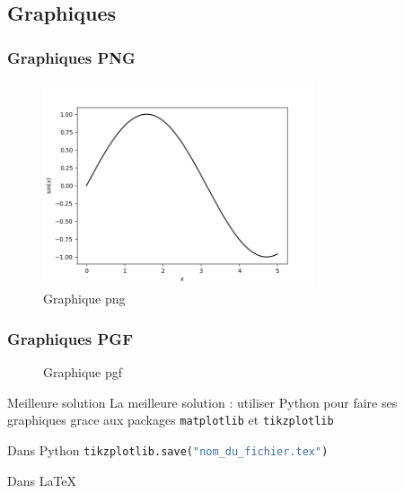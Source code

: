\documentclass{beamer}
\begin{document}
    \subsection{Graphiques}
    \begin{frame}
        \frametitle{Graphiques PNG}
        \begin{figure}[H]
            \centering
            \includegraphics[width=8cm,height=6cm]{assets/graphique.png}
            \caption{Graphique png}
        \end{figure}
    \end{frame}
    \begin{frame}
        \frametitle{Graphiques PGF}
        \begin{figure}[H]
        \centering
             
            \caption{Graphique pgf}
        \end{figure}
    \end{frame}
    \begin{frame}
        \begin{block}{Meilleure solution}
            La meilleure solution : utiliser Python pour faire ses
            graphiques grace aux packages \texttt{matplotlib} et \texttt{tikzplotlib}
        \end{block}
        \begin{block}{Dans Python}
            \lstinline[language=python]{tikzplotlib.save("nom_du_fichier.tex")}
        \end{block}
        \begin{block}{Dans LaTeX}
            
        \end{block}
    \end{frame}
\end{document}
